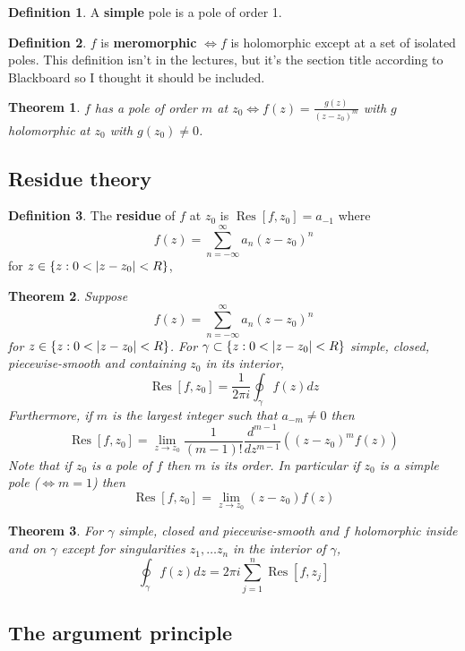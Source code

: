 \documentclass[12pt]{article}
\newtheorem{thm}{Theorem}[section]
\theoremstyle{definition}
\newtheorem{defn}{Definition}[section]
\DeclarePairedDelimiter\abs{\lvert}{\rvert}
\DeclareMathOperator{\Res}{Res}
\begin{document}
\begin{defn}
  A \textbf{simple} pole is a pole of order 1.
\end{defn}

\begin{defn}
  $f$ is \textbf{meromorphic} $\iff f$ is holomorphic except at a set of isolated poles.
  This definition isn't in the lectures, but it's the section title according to Blackboard so I thought it should be included.
\end{defn}

\begin{thm}
  $f$ has a pole of order $m$ at $z_0 \iff f(z) = \frac{g(z)}{(z - z_0)^m}$ with $g$ holomorphic at $z_0$ with $g(z_0) \neq 0$.
\end{thm}

\subsection{Residue theory}

\begin{defn}
  The \textbf{residue} of $f$ at $z_0$ is $\Res{[f, z_0]} = a_{-1}$ where
  $$f(z) = \sum_{n = -\infty}^{\infty}a_n(z - z_0)^n$$
  for $z \in \{z : 0 < \abs{z - z_0} < R\}$,
\end{defn}

\begin{thm}
  Suppose
  $$f(z) = \sum_{n = -\infty}^{\infty}a_n(z - z_0)^n$$
  for $z \in \{z : 0 < \abs{z - z_0} < R\}$.
  For $\gamma \subset \{z : 0 < \abs{z - z_0} < R\}$ simple, closed, piecewise-smooth and containing $z_0$ in its interior,
  $$\Res{[f, z_0]} = \frac{1}{2\pi i}\oint_{\gamma}f(z)dz$$
  Furthermore, if $m$ is the largest integer such that $a_{-m} \neq 0$ then
  $$\Res{[f, z_0]} = \lim_{z \to z_0}\frac{1}{(m - 1)!}\frac{d^{m - 1}}{dz^{m - 1}}((z - z_0)^mf(z))$$
  Note that if $z_0$ is a pole of $f$ then $m$ is its order.
  In particular if $z_0$ is a simple pole ($\iff m = 1$) then
  $$\Res{[f, z_0]} = \lim_{z \to z_0}(z - z_0)f(z)$$
\end{thm}

\begin{thm}
  For $\gamma$ simple, closed and piecewise-smooth and $f$ holomorphic inside and on $\gamma$ except for singularities $z_1, \ldots z_n$ in the interior of $\gamma$,
  $$\oint_{\gamma}f(z)dz = 2\pi i\sum_{j = 1}^n\Res{[f, z_j]}$$
\end{thm}

\subsection{The argument principle}
\end{document}
